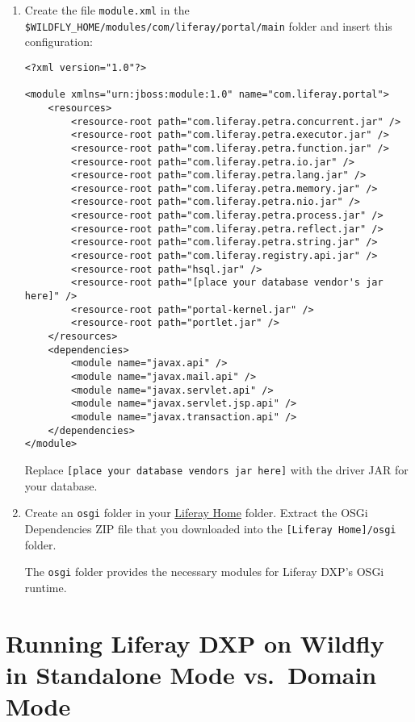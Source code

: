 \begin{enumerate}
\def\labelenumi{\arabic{enumi}.}
\setcounter{enumi}{2}
\item
  Create the file \texttt{module.xml} in the
  \texttt{\$WILDFLY\_HOME/modules/com/liferay/portal/main} folder and
  insert this configuration:

\begin{verbatim}
<?xml version="1.0"?>

<module xmlns="urn:jboss:module:1.0" name="com.liferay.portal">
    <resources>
        <resource-root path="com.liferay.petra.concurrent.jar" />
        <resource-root path="com.liferay.petra.executor.jar" />
        <resource-root path="com.liferay.petra.function.jar" />
        <resource-root path="com.liferay.petra.io.jar" />
        <resource-root path="com.liferay.petra.lang.jar" />
        <resource-root path="com.liferay.petra.memory.jar" />
        <resource-root path="com.liferay.petra.nio.jar" />
        <resource-root path="com.liferay.petra.process.jar" />
        <resource-root path="com.liferay.petra.reflect.jar" />
        <resource-root path="com.liferay.petra.string.jar" />
        <resource-root path="com.liferay.registry.api.jar" />
        <resource-root path="hsql.jar" />
        <resource-root path="[place your database vendor's jar here]" />
        <resource-root path="portal-kernel.jar" />
        <resource-root path="portlet.jar" />
    </resources>
    <dependencies>
        <module name="javax.api" />
        <module name="javax.mail.api" />
        <module name="javax.servlet.api" />
        <module name="javax.servlet.jsp.api" />
        <module name="javax.transaction.api" />
    </dependencies>
</module>
\end{verbatim}

  Replace
  \texttt{{[}place\ your\ database\ vendor\textquotesingle{}s\ jar\ here{]}}
  with the driver JAR for your database.
\item
  Create an \texttt{osgi} folder in your
  \href{/docs/7-2/deploy/-/knowledge_base/d/liferay-home}{Liferay Home}
  folder. Extract the OSGi Dependencies ZIP file that you downloaded
  into the \texttt{{[}Liferay\ Home{]}/osgi} folder.

  The \texttt{osgi} folder provides the necessary modules for Liferay
  DXP's OSGi runtime.
\end{enumerate}

\section{Running Liferay DXP on Wildfly in Standalone Mode vs.~Domain
Mode}\label{running-liferay-dxp-on-wildfly-in-standalone-mode-vs.-domain-mode}

